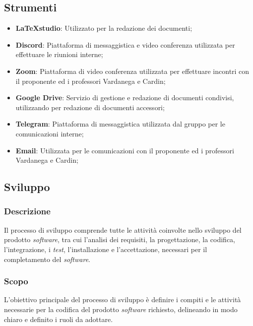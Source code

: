 \documentclass[5pt]{article}
\begin{document}
\subsection{Strumenti}
\begin{itemize}
	\item\textbf{ \LaTeX \space studio}: Utilizzato per la redazione dei documenti;
	\item \textbf{Discord}: Piattaforma di messaggistica e video conferenza utilizzata  per effettuare le riunioni interne;
	\item \textbf{Zoom}: Piattaforma di video conferenza utilizzata per effettuare incontri con il proponente ed i professori Vardanega e Cardin;
	\item \textbf{Google Drive}: Servizio di gestione e redazione di documenti condivisi, utilizzando per redazione di documenti accessori;
	\item \textbf{Telegram}: Piattaforma di messaggistica utilizzata dal gruppo per le comunicazioni interne;
	\item \textbf{Email}: Utilizzata per le comunicazioni con il proponente ed i professori Vardanega e Cardin;
\end{itemize}


\subsection{Sviluppo}
\subsubsection{Descrizione}

Il processo di sviluppo comprende tutte le attività coinvolte nello sviluppo del prodotto \textit{software}, tra cui l'analisi dei requisiti, la progettazione, la codifica, l'integrazione, i \textit{test}, l'installazione e l'accettazione, necessari per il completamento del \textit{software}.

\subsubsection{Scopo}
L'obiettivo principale del processo di sviluppo è definire i compiti e le attività necessarie per la codifica del prodotto \textit{software} richiesto, delineando in modo chiaro e definito i ruoli da adottare.
\end{document}
